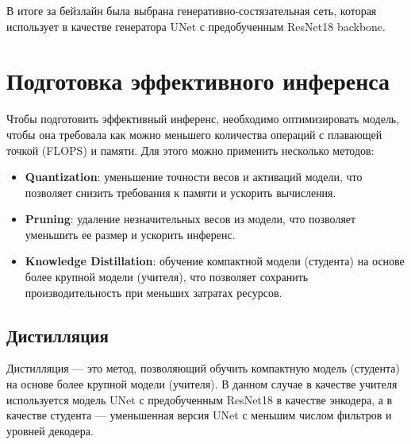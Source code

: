 \documentclass[14pt]{article}
\begin{document}
В итоге за бейзлайн была выбрана генеративно-состязательная сеть, которая
использует в качестве генератора UNet с предобученным ResNet18 backbone.




\section{Подготовка эффективного инференса}

Чтобы подготовить эффективный инференс, необходимо оптимизировать модель, чтобы она требовала как можно меньшего количества
операций с плавающей точкой (FLOPS) и памяти. Для этого можно применить несколько методов:

\begin{itemize}
    \item \textbf{Quantization}: уменьшение точности весов и активаций модели, что позволяет снизить требования к памяти и ускорить вычисления.
    \item \textbf{Pruning}: удаление незначительных весов из модели, что позволяет уменьшить ее размер и ускорить инференс.
    \item \textbf{Knowledge Distillation}: обучение компактной модели (студента) на основе более крупной модели (учителя), что позволяет сохранить производительность при меньших затратах ресурсов.
\end{itemize}

\subsection{Дистилляция}

Дистилляция — это метод, позволяющий обучить компактную модель (студента) на основе более крупной модели (учителя).
В данном случае в качестве учителя используется модель
UNet с предобученным ResNet18 в качестве энкодера, а в качестве студента — уменьшенная версия UNet с меньшим числом фильтров и уровней декодера.
\end{document}
